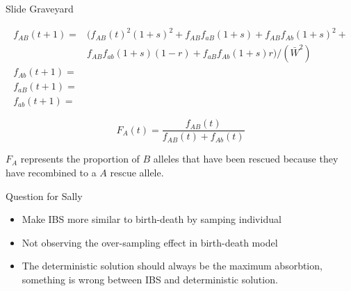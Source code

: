 \documentclass{beamer}
\begin{document}
\begin{frame}{Slide Graveyard}


    \begin{equation*}
    \begin{aligned}
        f_{AB}(t+1)= &(f_{AB}(t)^2(1+s)^2+f_{AB}f_{aB}(1+s)+f_{AB}f_{Ab}(1+s)^2+ \\
        &f_{AB}f_{ab}(1+s)(1-r)+f_{aB}f_{Ab}(1+s)r)/(\bar{W}^2) \\
        f_{Ab}(t+1)=    \\
        f_{aB}(t+1)=    \\
        f_{ab}(t+1)=
        \end{aligned}
    \end{equation*}
    
\begin{equation*}
    F_A(t)= \frac{f_{AB}(t)}{f_{AB}(t)+f_{Ab}(t)}
\end{equation*}

$F_A$ represents the proportion of $B$ alleles that have been rescued because they have recombined to a $A$ rescue allele.
\end{frame}

\begin{frame}{Question for Sally}
\begin{itemize}
    \item Make IBS more similar to birth-death by samping individual 
    \item Not observing the over-sampling effect in birth-death model
    \item The deterministic solution should always be the maximum absorbtion, something is wrong between IBS and deterministic solution. 
\end{itemize}
    
\end{frame}
\end{document}
